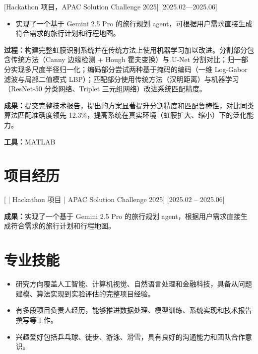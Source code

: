 \documentclass{resume}
\begin{document}
[Hackathon 项目，APAC Solution Challenge 2025]
[2025.02—2025.06]

\begin{itemize}
  \item 实现了一个基于 Gemini 2.5 Pro 的旅行规划 agent，可根据用户需求直接生成符合需求的旅行计划和行程地图。
\end{itemize}

\textbf{过程：}构建完整虹膜识别系统并在传统方法上使用机器学习加以改进。分割部分包含传统方法（Canny 边缘检测 + Hough 霍夫变换）与 U-Net 分割对比；归一部分实现多尺度半径归一化；编码部分尝试两种基于掩码的编码（一维 Log-Gabor 滤波与局部二值模式 LBP）；匹配部分使用传统方法（汉明距离）与机器学习（ResNet-50 分类网络、Triplet 三元组网络）改进系统匹配精度。

\textbf{成果：}提交完整技术报告，提出的方案显著提升分割精度和匹配鲁棒性，对比同类算法匹配准确度领先 12.3\%，提高系统在真实环境（虹膜扩大、缩小）下的泛化能力。

\textbf{工具：}MATLAB

\section{项目经历}
[ | Hackathon 项目 | APAC Solution Challenge 2025]
[2025.02 -- 2025.06]

\textbf{成果：}实现了一个基于 Gemini 2.5 Pro 的旅行规划 agent，根据用户需求直接生成符合需求的旅行计划和行程地图。

\section{专业技能}
\begin{itemize}
  \item 研究方向覆盖人工智能、计算机视觉、自然语言处理和金融科技，具备从问题建模、算法实现到实验评估的完整项目经验。
  \item 有多段项目负责人经历，能够推进数据处理、模型训练、系统实现和技术报告撰写等工作。
  \item 兴趣爱好包括乒乓球、徒步、游泳、滑雪，具有良好的沟通能力和团队合作意识。
\end{itemize}
\end{document}
